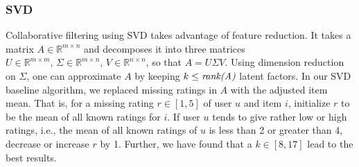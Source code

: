 \subsubsection{\ac{SVD}}\label{sec:svd}

Collaborative filtering using \ac{SVD} takes advantage of feature reduction. It takes a matrix $A\in \mathbb{R}^{m \times n}$ and decomposes it into three matrices $U\in \mathbb{R}^{m \times m}\text{, }\Sigma\in\mathbb{R}^{m\times n}\text{, }V\in\mathbb{R}^{n\times n}$, so that $A = U\Sigma V$. Using dimension reduction on $\Sigma$, one can approximate $A$ by keeping $k\leq\text{\textit{rank(A)}}$ latent factors. In our \ac{SVD} baseline algorithm, we replaced missing ratings in $A$ with the adjusted item mean. That is, for a missing rating $r\in[1, 5]$ of user $u$ and item $i$, initialize $r$ to be the mean of all known ratings for $i$. If user $u$ tends to give rather low or high ratings, i.e., the mean of all known ratings of $u$ is less than 2 or greater than 4, decrease or increase $r$ by 1. Further, we have found that a $k\in [8,17]$ lead to the best results.
